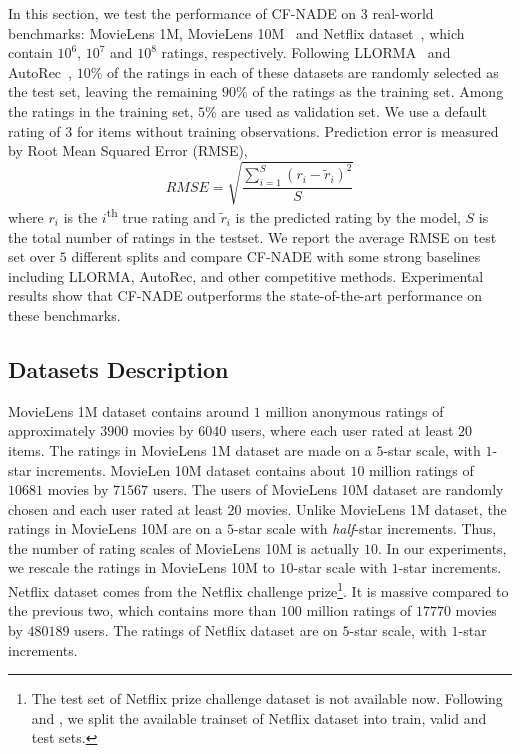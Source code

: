 \documentclass{article}
\newcommand{\cfnade}{CF-NADE\xspace}
\begin{document}
In this section, we test the performance of \cfnade on 3 real-world
benchmarks: MovieLens 1M, MovieLens 10M~\citep{harper2015movielens}
and Netflix dataset~\citep{bennett2007netflix}, which contain $10^6$,
$10^7$ and $10^8$ ratings, respectively. Following
LLORMA~\citep{lee2013local} and AutoRec~\citep{sedhain2015autorec},
$10\%$ of the ratings in each of these datasets are randomly selected
as the test set, leaving the remaining $90\%$ of the ratings as the
training set. Among the ratings in the training set, $5\%$ are used as
validation set. We use a default rating of $3$ for items without
training observations. Prediction error is measured by Root Mean
Squared Error (RMSE), \begin{equation}
	\textit{RMSE}=\sqrt{\frac{\sum_{i=1}^S (r_i-\tilde{r}_i)^2}{S}}
	\label{eqn:rmse}
\end{equation}
where $r_i$ is the $i$\textsuperscript{th} true rating and
$\tilde{r}_i$ is the predicted rating by the model, $S$ is the total
number of ratings in the testset. We report the average RMSE on test
set over $5$ different splits and compare \cfnade with some strong
baselines including LLORMA, AutoRec, and other competitive
methods. Experimental results show that \cfnade outperforms the
state-of-the-art performance on these benchmarks.

\subsection{Datasets Description}
\label{sec:datasets}
MovieLens 1M dataset contains around $1$ million anonymous ratings of
approximately $3900$ movies by $6040$ users, where each user rated at
least $20$ items. The ratings in MovieLens 1M dataset are made on a
$5$-star scale, with $1$-star increments. MovieLen 10M dataset
contains about $10$ million ratings of $10681$ movies by $71567$
users. The users of MovieLens 10M dataset are randomly chosen and each
user rated at least $20$ movies. Unlike MovieLens 1M dataset, the
ratings in MovieLens 10M are on a $5$-star scale with
\textit{half}-star increments. Thus, the number of rating scales of
MovieLens 10M is actually $10$. In our experiments, we rescale the
ratings in MovieLens 10M to $10$-star scale with $1$-star
increments. Netflix dataset comes from the Netflix challenge
prize\footnote{The test set of Netflix prize challenge dataset is not
  available now. Following \citet{lee2013local} and
  \citet{sedhain2015autorec}, we split the available trainset of
  Netflix dataset into train, valid and test sets.}. It
is massive compared to the previous two, which contains more than
$100$ million ratings of $17770$ movies by $480189$ users. The ratings
of Netflix dataset are on $5$-star scale, with $1$-star increments.
\end{document}
